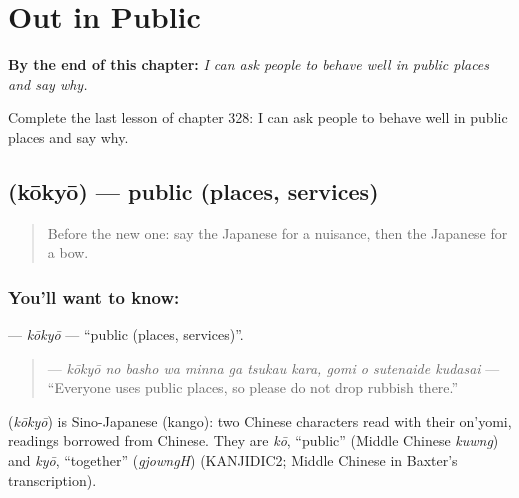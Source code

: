 
\chapter{Out in Public}
\label{ch:ja-out-in-public}

\begin{chapteropening}
\textbf{By the end of this chapter:} \emph{I can ask people to behave well in public places and say why.}

Complete the last lesson of chapter 328: I can ask people to behave well in public places and say why.
\end{chapteropening}

\section[\texorpdfstring{\ja{こうきょう} (kōkyō)}{こうきょう (kōkyō)}]{ (kōkyō) — public (places, services)}

\label{lesson:JA-C328-koukyou}



\begin{quote}
Before the new one: say the Japanese for a nuisance, then the Japanese for a bow.
\end{quote}

\subsection*{You'll want to know: }
\textbf{} — \emph{kōkyō} — \textquotedblleft{}public (places, services)\textquotedblright{}.

\begin{quote}
\textbf{     } — \emph{kōkyō no basho wa minna ga tsukau kara, gomi o sutenaide kudasai} — \textquotedblleft{}Everyone uses public places, so please do not drop rubbish there.\textquotedblright{}
\end{quote}

\begin{cousinweb}
\textbf{} (\emph{kōkyō}) is Sino-Japanese (kango): two Chinese characters read with their on'yomi, readings borrowed from Chinese. They are \emph{kō}, \textquotedblleft{}public\textquotedblright{} (Middle Chinese \emph{kuwng}) and \emph{kyō}, \textquotedblleft{}together\textquotedblright{} (\emph{gjowngH}) (KANJIDIC2; Middle Chinese in Baxter's transcription).
\end{cousinweb}

